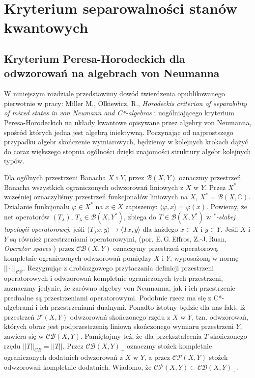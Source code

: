 \chapter{Kryterium separowalności stanów kwantowych}
\label{chp:PHcrit}
\section{Kryterium Peresa-Horodeckich dla odwzorowań na algebrach von Neumanna}
W niniejszym rozdziale przedstawimy dowód twierdzenia
opublikowanego pierwotnie w pracy:
Miller M., Olkiewicz, R.,
\emph{Horodeckis criterion of separability of mixed states in von Neumann and C*-algebras}
\cite{miller2014horodeckis}
i uogólniającego kryterium Peresa-Horodeckich na układy
kwantowe opisywane przez algebry von Neumanna,
spośród których jedna jest algebrą iniektywną.
Poczynając od najprostszego przypadku algebr skończenie wymiarowych,
będziemy w kolejnych krokach dążyć do coraz większego stopnia
ogólności dzięki znajomości struktury algebr kolejnych typów.

\vspace{0.5cm}
Dla ogólnych przestrzeni Banacha $X$ i $Y$, przez
$\mathcal{B}(X,Y)$
oznaczmy przestrzeń Banacha wszystkich ograniczonych odwzorowań
liniowych z $X$ w $Y$.
Przez $X^{*}$ wcześniej oznaczyliśmy przestrzeń funkcjonałów liniowych na $X$,
$X^{*} = \mathcal{B}(X, \mathbb{C})$.
Działanie funkcjonału $\varphi \in X^{*}$ na $x \in X$
zapiszemy: $\langle  \varphi , x \rangle = \varphi(x)$.
Powiemy, że net operatorów $(T_{\lambda})$,
$T_{\lambda} \in \mathcal{B}(X, Y^{*})$, zbiega do
$T \in \mathcal{B}(X, Y^{*})$ w \emph{$^{*}$-słabej topologii operatorowej}, jeśli
\label{page:weakstaroperatortop}
$\langle T_{\lambda} x, y \rangle \rightarrow \langle Tx, y \rangle$
dla każdego $x \in X$ i $y \in Y$.
Jeśli $X$ i $Y$ są również przestrzeniami operatorowymi,
(por. E.\,G.\,Effros, Z.-J.\,Ruan, \emph{Operator spaces} \cite{Effros2000})
przez $\mathcal{CB}(X,Y)$ oznaczymy przestrzeń operatorową
kompletnie ograniczonych odwzorowań pomiędzy $X$ i $Y$,
wyposażoną w normę
$|| \cdot ||_{\mathcal{CB}}$.
Rezygnując z drobiazgowego przytaczania definicji przestrzeni operatorowych
i odwzorowań kompletnie ograniczonych tych przestrzeni,
zaznaczmy jedynie, że zarówno algebry von Neumanna, jak i
ich przestrzenie predualne są przestrzeniami operatorowymi.
Podobnie rzecz ma się z C*-algebrami i ich przestrzeniami dualnymi.
Ponadto istotny będzie dla nas fakt, iż
przestrzeń $\mathcal{F}(X,Y)$
odwzorowań skończonego rzędu z $X$ w $Y$,
tzn. odwzorowań, których obraz jest podprzestrzenią liniową skończonego wymiaru
przestrzeni $Y$, zawiera się w $\mathcal{CB}(X,Y)$.
Pamiętajmy też, że dla przekształcenia $T$ skończonego rzędu
$||T||_{CB} = ||T||$.
Przez $\mathcal{CB}(X,Y)_{+}$
oznaczmy stożek kompletnie ograniczonych dodatnich odwzorowań
z $X$ w $Y$, a przez $\mathcal{CP}(X,Y)$ stożek odwzorowań kompletnie dodatnich.
Wiadomo, że $\mathcal{CP}(X,Y) \subset \mathcal{CB}(X,Y)_{+}$.

